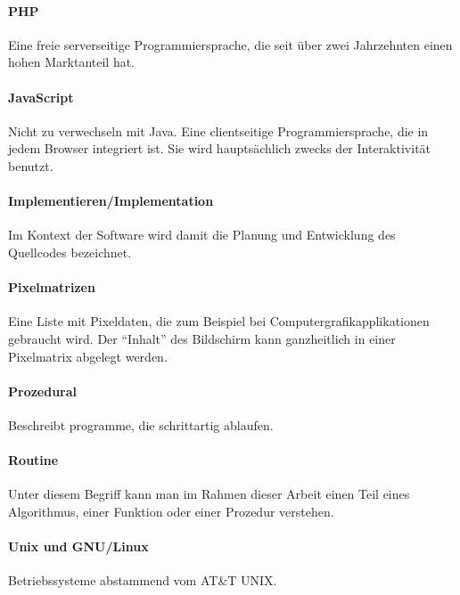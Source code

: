 \paragraph{PHP} Eine freie serverseitige Programmiersprache, die seit über zwei Jahrzehnten einen hohen Marktanteil hat.
\paragraph{JavaScript} Nicht zu verwechseln mit Java. Eine clientseitige Programmiersprache, die in jedem Browser integriert ist. Sie wird hauptsächlich zwecks der Interaktivität benutzt. 
\paragraph{Implementieren/Implementation} Im Kontext der Software wird damit die Planung und Entwicklung des Quellcodes bezeichnet.
\paragraph{Pixelmatrizen} Eine Liste mit Pixeldaten, die zum Beispiel bei Computergrafikapplikationen gebraucht wird. Der ``Inhalt'' des Bildschirm kann ganzheitlich in einer Pixelmatrix abgelegt werden.
\paragraph{Prozedural} Beschreibt programme, die schrittartig ablaufen.
\paragraph{Routine} Unter diesem Begriff kann man im Rahmen dieser Arbeit einen Teil eines Algorithmus, einer Funktion oder einer Prozedur verstehen.
\paragraph{Unix und GNU/Linux} Betriebssysteme abstammend vom AT\&T UNIX.
